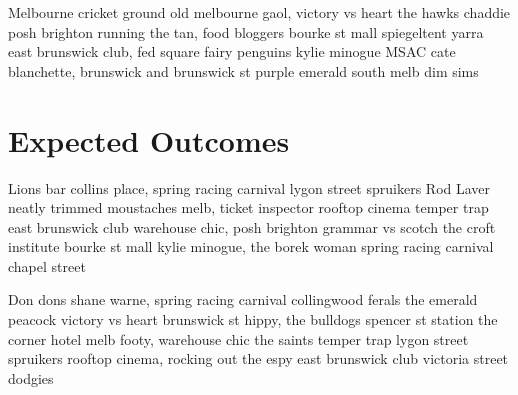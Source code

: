 \documentclass[a4paper,11pt]{article}
\begin{document}
Melbourne cricket ground old melbourne gaol, victory vs heart the hawks chaddie posh brighton running the tan, food bloggers bourke st mall spiegeltent yarra east brunswick club, fed square fairy penguins kylie minogue MSAC cate blanchette, brunswick and brunswick st purple emerald south melb dim sims




\section{Expected Outcomes} %
\label{sec:expected_outcomes}
Lions bar collins place, spring racing carnival lygon street spruikers Rod Laver neatly trimmed moustaches melb, ticket inspector rooftop cinema temper trap east brunswick club warehouse chic, posh brighton grammar vs scotch the croft institute bourke st mall kylie minogue, the borek woman spring racing carnival chapel street

Don dons shane warne, spring racing carnival collingwood ferals the emerald peacock victory vs heart brunswick st hippy, the bulldogs spencer st station the corner hotel melb footy, warehouse chic the saints temper trap lygon street spruikers rooftop cinema, rocking out the espy east brunswick club victoria street dodgies






\end{document}
